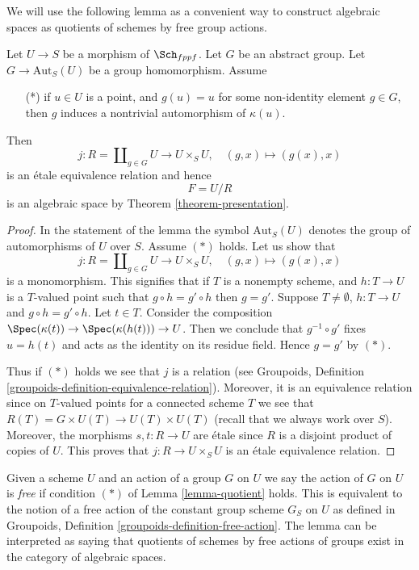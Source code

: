 \medskip\noindent
We will use the following lemma as a convenient way to construct
algebraic spaces as quotients of schemes by free group actions.

\begin{lemma}
\label{lemma-quotient}
Let $U \to S$ be a morphism of $\Sch_{fppf}$.
Let $G$ be an abstract group. Let $G \to \text{Aut}_S(U)$
be a group homomorphism. Assume
\begin{itemize}
\item[(*)] if $u \in U$ is a point, and $g(u) = u$
for some non-identity element $g \in G$, then $g$
induces a nontrivial automorphism of $\kappa(u)$.
\end{itemize}
Then
$$
j :
R = \coprod\nolimits_{g \in G} U
\longrightarrow
U \times_S U,
\quad
(g, x) \longmapsto (g(x), x)
$$
is an \'etale equivalence relation and hence
$$
F = U/R
$$
is an algebraic space by Theorem \ref{theorem-presentation}.
\end{lemma}

\begin{proof}
In the statement of the lemma the symbol $\text{Aut}_S(U)$ denotes
the group of automorphisms of $U$ over $S$.
Assume $(*)$ holds. Let us show that
$$
j :
R = \coprod\nolimits_{g \in G} U
\longrightarrow
U \times_S U,
\quad
(g, x) \longmapsto (g(x), x)
$$
is a monomorphism. This signifies that if $T$ is a nonempty
scheme, and $h : T \to U$ is a $T$-valued point such that
$g \circ h = g' \circ h$ then $g = g'$. Suppose
$T \not = \emptyset$, $h : T \to U$ and $g \circ h = g' \circ h$.
Let $t \in T$. Consider the composition
$\Spec(\kappa(t)) \to \Spec(\kappa(h(t))) \to U$.
Then we conclude that $g^{-1} \circ g'$ fixes $u = h(t)$ and
acts as the identity on its residue field. Hence $g = g'$ by $(*)$.

\medskip\noindent
Thus if $(*)$ holds we see that $j$ is a relation (see
Groupoids, Definition \ref{groupoids-definition-equivalence-relation}).
Moreover, it is an equivalence relation since on $T$-valued points
for a connected scheme $T$ we see that
$R(T) = G \times U(T) \to U(T) \times U(T)$ (recall that we always
work over $S$). Moreover, the morphisms $s, t : R \to U$ are \'etale
since $R$ is a disjoint product of copies of $U$.
This proves that $j : R \to U \times_S U$ is an \'etale equivalence relation.
\end{proof}

\noindent
Given a scheme $U$ and an action of a group $G$ on $U$ we say the action
of $G$ on $U$ is {\it free} if condition $(*)$ of Lemma \ref{lemma-quotient}
holds. This is equivalent to the notion of a free action of the constant
group scheme $G_S$ on $U$ as defined in
Groupoids, Definition \ref{groupoids-definition-free-action}.
The lemma can be interpreted as saying that quotients of schemes by
free actions of groups exist in the category of algebraic spaces.

